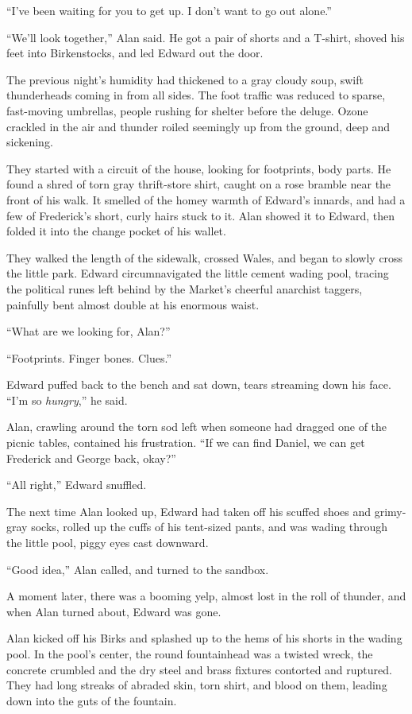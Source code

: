 \documentclass{article}
\begin{document}
``I've been waiting for you to get up.  I don't want to go out
alone.''

``We'll look together,'' Alan said.  He got a pair of shorts and a
T-shirt, shoved his feet into Birkenstocks, and led Edward out the
door.

The previous night's humidity had thickened to a gray cloudy soup,
swift thunderheads coming in from all sides.  The foot traffic was
reduced to sparse, fast-moving umbrellas, people rushing for shelter
before the deluge.  Ozone crackled in the air and thunder roiled
seemingly up from the ground, deep and sickening.

They started with a circuit of the house, looking for footprints, body
parts.  He found a shred of torn gray thrift-store shirt, caught on a
rose bramble near the front of his walk.  It smelled of the homey
warmth of Edward's innards, and had a few of Frederick's short, curly
hairs stuck to it.  Alan showed it to Edward, then folded it into the
change pocket of his wallet.

They walked the length of the sidewalk, crossed Wales, and began to
slowly cross the little park.  Edward circumnavigated the little
cement wading pool, tracing the political runes left behind by the
Market's cheerful anarchist taggers, painfully bent almost double at
his enormous waist.

``What are we looking for, Alan?''

``Footprints.  Finger bones.  Clues.''

Edward puffed back to the bench and sat down, tears streaming down his
face.  ``I'm so \textit{hungry},'' he said.

Alan, crawling around the torn sod left when someone had dragged one
of the picnic tables, contained his frustration.  ``If we can find
Daniel, we can get Frederick and George back, okay?''

``All right,'' Edward snuffled.

The next time Alan looked up, Edward had taken off his scuffed shoes
and grimy-gray socks, rolled up the cuffs of his tent-sized pants, and
was wading through the little pool, piggy eyes cast downward.

``Good idea,'' Alan called, and turned to the sandbox.

A moment later, there was a booming yelp, almost lost in the roll of
thunder, and when Alan turned about, Edward was gone.

Alan kicked off his Birks and splashed up to the hems of his shorts in
the wading pool.  In the pool's center, the round fountainhead was a
twisted wreck, the concrete crumbled and the dry steel and brass
fixtures contorted and ruptured.  They had long streaks of abraded
skin, torn shirt, and blood on them, leading down into the guts of the
fountain.
\end{document}
